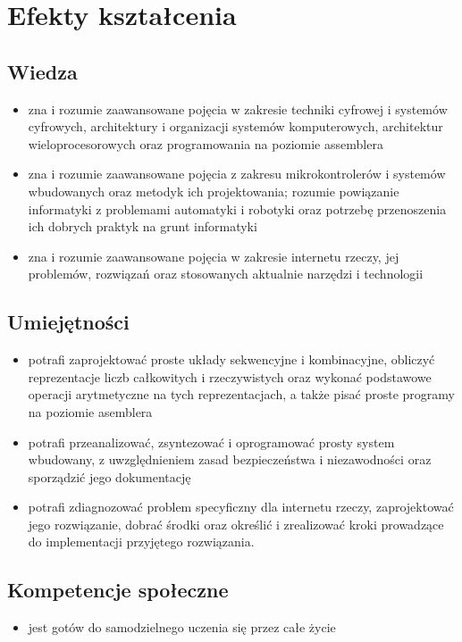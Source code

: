 \documentclass[12pt, a4paper]{article}
\begin{document}
\section{Efekty kształcenia}

\subsection*{Wiedza}
\begin{itemize}
  \item zna i rozumie zaawansowane pojęcia w zakresie techniki cyfrowej i systemów cyfrowych, architektury i organizacji systemów komputerowych, architektur wieloprocesorowych oraz programowania na poziomie assemblera
  \item zna i rozumie zaawansowane pojęcia z zakresu mikrokontrolerów i systemów wbudowanych oraz metodyk ich projektowania; rozumie powiązanie informatyki z problemami automatyki i robotyki oraz potrzebę przenoszenia ich dobrych praktyk na grunt informatyki
  \item zna i rozumie zaawansowane pojęcia w zakresie internetu rzeczy, jej problemów, rozwiązań oraz stosowanych aktualnie narzędzi i technologii
\end{itemize}

\subsection*{Umiejętności}
\begin{itemize}
  \item potrafi zaprojektować proste układy sekwencyjne i kombinacyjne, obliczyć reprezentacje liczb całkowitych i rzeczywistych oraz wykonać podstawowe operacji arytmetyczne na tych reprezentacjach, a także pisać proste programy na poziomie asemblera
  \item potrafi przeanalizować, zsyntezować i oprogramować prosty system wbudowany, z uwzględnieniem zasad bezpieczeństwa i niezawodności oraz sporządzić jego dokumentację
  \item potrafi zdiagnozować problem specyficzny dla internetu rzeczy, zaprojektować jego rozwiązanie, dobrać środki oraz określić i zrealizować kroki prowadzące do implementacji przyjętego rozwiązania.
\end{itemize}

\subsection*{Kompetencje społeczne}
\begin{itemize}
  \item jest gotów do samodzielnego uczenia się przez całe życie
\end{itemize}
\end{document}
